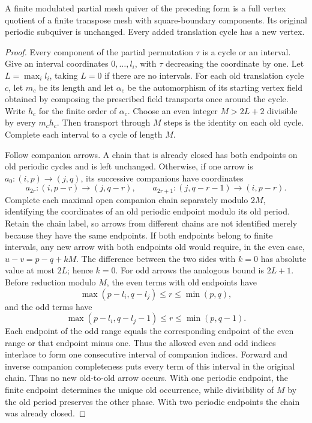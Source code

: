 \begin{lemma}\label{lem:completion}
A finite modulated partial mesh quiver of the preceding form is a full vertex quotient of a finite transpose mesh with square-boundary components. Its original periodic subquiver is unchanged. Every added translation cycle has a new vertex.
\end{lemma}
\begin{proof}
Every component of the partial permutation $\tau$ is a cycle or an interval. Give an interval coordinates $0,\ldots,l_i$, with $\tau$ decreasing the coordinate by one. Let $L=\max_i l_i$, taking $L=0$ if there are no intervals. For each old translation cycle $c$, let $m_c$ be its length and let $\alpha_c$ be the automorphism of its starting vertex field obtained by composing the prescribed field transports once around the cycle. Write $h_c$ for the finite order of $\alpha_c$. Choose an even integer $M>2L+2$ divisible by every $m_ch_c$. Then transport through $M$ steps is the identity on each old cycle. Complete each interval to a cycle of length $M$.

Follow companion arrows. A chain that is already closed has both endpoints on old periodic cycles and is left unchanged. Otherwise, if one arrow is
$a_0:(i,p)\to(j,q)$, its successive companions have coordinates
\[
 a_{2r}:(i,p-r)\to(j,q-r),\qquad
 a_{2r+1}:(j,q-r-1)\to(i,p-r).
\]
Complete each maximal open companion chain separately modulo $2M$, identifying the coordinates of an old periodic endpoint modulo its old period. Retain the chain label, so arrows from different chains are not identified merely because they have the same endpoints. If both endpoints belong to finite intervals, any new arrow with both endpoints old would require, in the even case,
$u-v=p-q+kM$. The difference between the two sides with $k=0$ has absolute value at most $2L$; hence $k=0$. For odd arrows the analogous bound is $2L+1$. Before reduction modulo $M$, the even terms with old endpoints have
\[
 \max(p-l_i,q-l_j)\le r\le\min(p,q),
\]
and the odd terms have
\[
 \max(p-l_i,q-l_j-1)\le r\le\min(p,q-1).
\]
Each endpoint of the odd range equals the corresponding endpoint of the even range or that endpoint minus one. Thus the allowed even and odd indices interlace to form one consecutive interval of companion indices. Forward and inverse companion completeness puts every term of this interval in the original chain. Thus no new old-to-old arrow occurs. With one periodic endpoint, the finite endpoint determines the unique old occurrence, while divisibility of $M$ by the old period preserves the other phase. With two periodic endpoints the chain was already closed.


\end{proof}
